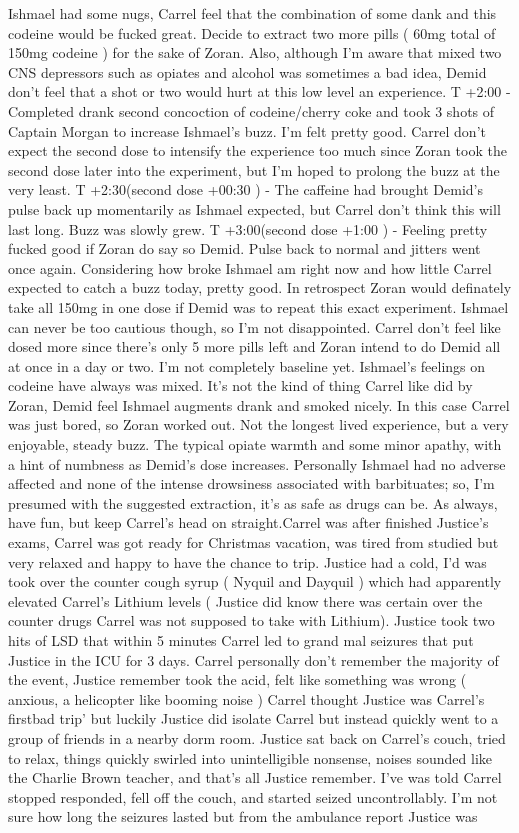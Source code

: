 \documentclass[12pt]{book}
\begin{document}
Ishmael had some nugs, Carrel feel that the combination of some dank and this codeine would be fucked great. Decide to extract two more pills ( 60mg total of 150mg codeine ) for the sake of Zoran. Also, although I'm aware that mixed two CNS depressors such as opiates and alcohol was sometimes a bad idea, Demid don't feel that a shot or two would hurt at this low level an experience. T +2:00 - Completed drank second concoction of codeine/cherry coke and took 3 shots of Captain Morgan to increase Ishmael's buzz. I'm felt pretty good. Carrel don't expect the second dose to intensify the experience too much since Zoran took the second dose later into the experiment, but I'm hoped to prolong the buzz at the very least. T +2:30(second dose +00:30 ) - The caffeine had brought Demid's pulse back up momentarily as Ishmael expected, but Carrel don't think this will last long. Buzz was slowly grew. T +3:00(second dose +1:00 ) - Feeling pretty fucked good if Zoran do say so Demid. Pulse back to normal and jitters went once again. Considering how broke Ishmael am right now and how little Carrel expected to catch a buzz today, pretty good. In retrospect Zoran would definately take all 150mg in one dose if Demid was to repeat this exact experiment. Ishmael can never be too cautious though, so I'm not disappointed. Carrel don't feel like dosed more since there's only 5 more pills left and Zoran intend to do Demid all at once in a day or two. I'm not completely baseline yet. Ishmael's feelings on codeine have always was mixed. It's not the kind of thing Carrel like did by Zoran, Demid feel Ishmael augments drank and smoked nicely. In this case Carrel was just bored, so Zoran worked out. Not the longest lived experience, but a very enjoyable, steady buzz. The typical opiate warmth and some minor apathy, with a hint of numbness as Demid's dose increases. Personally Ishmael had no adverse affected and none of the intense drowsiness associated with barbituates; so, I'm presumed with the suggested extraction, it's as safe as drugs can be. As always, have fun, but keep Carrel's head on straight.Carrel was after finished Justice's exams, Carrel was got ready for Christmas vacation, was tired from studied but very relaxed and happy to have the chance to trip. Justice had a cold, I'd was took over the counter cough syrup ( Nyquil and Dayquil ) which had apparently elevated Carrel's Lithium levels ( Justice did know there was certain over the counter drugs Carrel was not supposed to take with Lithium). Justice took two hits of LSD that within 5 minutes Carrel led to grand mal seizures that put Justice in the ICU for 3 days. Carrel personally don't remember the majority of the event, Justice remember took the acid, felt like something was wrong ( anxious, a helicopter like booming noise ) Carrel thought Justice was Carrel's firstbad trip' but luckily Justice did isolate Carrel but instead quickly went to a group of friends in a nearby dorm room. Justice sat back on Carrel's couch, tried to relax, things quickly swirled into unintelligible nonsense, noises sounded like the Charlie Brown teacher, and that's all Justice remember. I've was told Carrel stopped responded, fell off the couch, and started seized uncontrollably. I'm not sure how long the seizures lasted but from the ambulance report Justice was 
\end{document}
